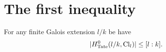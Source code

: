 




\section{The first inequality}

\begin{theorem} \label{thm:first inequality}
	For any finite Galois extension $l/k$ be have
	\[
		|H^0_{\mathrm{Tate}}(l/k, \mathrm{Cl}_{l}) | \le [l : k].
	\]
\end{theorem}

